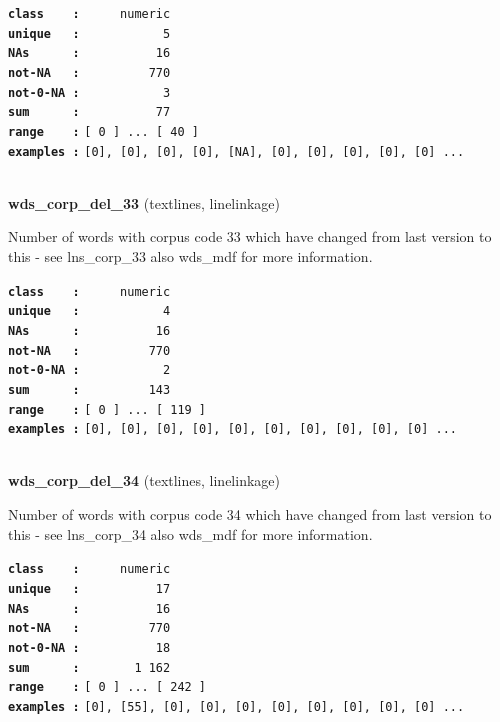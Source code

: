 \documentclass[]{article}
\begin{document}
\textbf{\texttt{class\ \ \ \ :}} \texttt{~~~~~numeric}\\
\textbf{\texttt{unique\ \ \ :}} \texttt{~~~~~~~~~~~5}\\
\textbf{\texttt{NAs\ \ \ \ \ \ :}} \texttt{~~~~~~~~~~16}\\
\textbf{\texttt{not-NA\ \ \ :}} \texttt{~~~~~~~~~770}\\
\textbf{\texttt{not-0-NA\ :}} \texttt{~~~~~~~~~~~3}\\
\textbf{\texttt{sum\ \ \ \ \ \ :}} \texttt{~~~~~~~~~~77}\\
\textbf{\texttt{range\ \ \ \ :}}
\texttt{{[}\ 0\ {]}\ ...\ {[}\ 40\ {]}}\\
\textbf{\texttt{examples\ :}}
\texttt{{[}0{]},\ {[}0{]},\ {[}0{]},\ {[}0{]},\ {[}NA{]},\ {[}0{]},\ {[}0{]},\ {[}0{]},\ {[}0{]},\ {[}0{]}\ ...}\\

~

\textbf{wds\_corp\_del\_33} (textlines, linelinkage)

Number of words with corpus code 33 which have changed from last version
to this - see lns\_corp\_33 also wds\_mdf for more information.

\textbf{\texttt{class\ \ \ \ :}} \texttt{~~~~~numeric}\\
\textbf{\texttt{unique\ \ \ :}} \texttt{~~~~~~~~~~~4}\\
\textbf{\texttt{NAs\ \ \ \ \ \ :}} \texttt{~~~~~~~~~~16}\\
\textbf{\texttt{not-NA\ \ \ :}} \texttt{~~~~~~~~~770}\\
\textbf{\texttt{not-0-NA\ :}} \texttt{~~~~~~~~~~~2}\\
\textbf{\texttt{sum\ \ \ \ \ \ :}} \texttt{~~~~~~~~~143}\\
\textbf{\texttt{range\ \ \ \ :}}
\texttt{{[}\ 0\ {]}\ ...\ {[}\ 119\ {]}}\\
\textbf{\texttt{examples\ :}}
\texttt{{[}0{]},\ {[}0{]},\ {[}0{]},\ {[}0{]},\ {[}0{]},\ {[}0{]},\ {[}0{]},\ {[}0{]},\ {[}0{]},\ {[}0{]}\ ...}\\

~

\textbf{wds\_corp\_del\_34} (textlines, linelinkage)

Number of words with corpus code 34 which have changed from last version
to this - see lns\_corp\_34 also wds\_mdf for more information.

\textbf{\texttt{class\ \ \ \ :}} \texttt{~~~~~numeric}\\
\textbf{\texttt{unique\ \ \ :}} \texttt{~~~~~~~~~~17}\\
\textbf{\texttt{NAs\ \ \ \ \ \ :}} \texttt{~~~~~~~~~~16}\\
\textbf{\texttt{not-NA\ \ \ :}} \texttt{~~~~~~~~~770}\\
\textbf{\texttt{not-0-NA\ :}} \texttt{~~~~~~~~~~18}\\
\textbf{\texttt{sum\ \ \ \ \ \ :}} \texttt{~~~~~~~1~162}\\
\textbf{\texttt{range\ \ \ \ :}}
\texttt{{[}\ 0\ {]}\ ...\ {[}\ 242\ {]}}\\
\textbf{\texttt{examples\ :}}
\texttt{{[}0{]},\ {[}55{]},\ {[}0{]},\ {[}0{]},\ {[}0{]},\ {[}0{]},\ {[}0{]},\ {[}0{]},\ {[}0{]},\ {[}0{]}\ ...}\\
\end{document}
